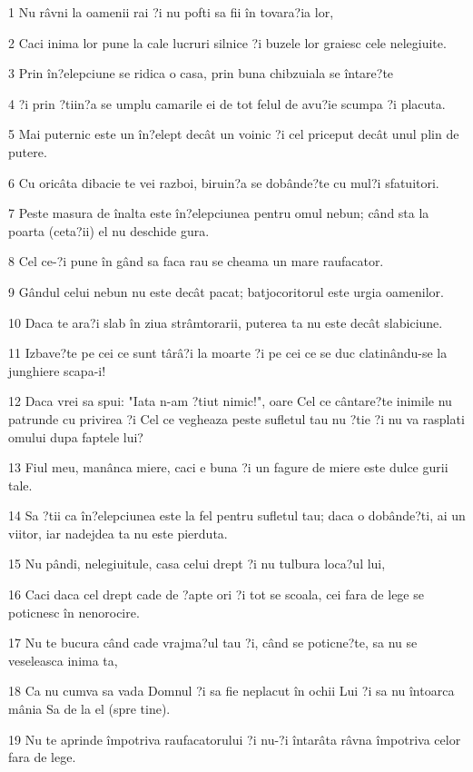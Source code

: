 \par 1 Nu râvni la oamenii rai ?i nu pofti sa fii în tovara?ia lor,
\par 2 Caci inima lor pune la cale lucruri silnice ?i buzele lor graiesc cele nelegiuite.
\par 3 Prin în?elepciune se ridica o casa, prin buna chibzuiala se întare?te
\par 4 ?i prin ?tiin?a se umplu camarile ei de tot felul de avu?ie scumpa ?i placuta.
\par 5 Mai puternic este un în?elept decât un voinic ?i cel priceput decât unul plin de putere.
\par 6 Cu oricâta dibacie te vei razboi, biruin?a se dobânde?te cu mul?i sfatuitori.
\par 7 Peste masura de înalta este în?elepciunea pentru omul nebun; când sta la poarta (ceta?ii) el nu deschide gura.
\par 8 Cel ce-?i pune în gând sa faca rau se cheama un mare raufacator.
\par 9 Gândul celui nebun nu este decât pacat; batjocoritorul este urgia oamenilor.
\par 10 Daca te ara?i slab în ziua strâmtorarii, puterea ta nu este decât slabiciune.
\par 11 Izbave?te pe cei ce sunt târâ?i la moarte ?i pe cei ce se duc clatinându-se la junghiere scapa-i!
\par 12 Daca vrei sa spui: "Iata n-am ?tiut nimic!", oare Cel ce cântare?te inimile nu patrunde cu privirea ?i Cel ce vegheaza peste sufletul tau nu ?tie ?i nu va rasplati omului dupa faptele lui?
\par 13 Fiul meu, manânca miere, caci e buna ?i un fagure de miere este dulce gurii tale.
\par 14 Sa ?tii ca în?elepciunea este la fel pentru sufletul tau; daca o dobânde?ti, ai un viitor, iar nadejdea ta nu este pierduta.
\par 15 Nu pândi, nelegiuitule, casa celui drept ?i nu tulbura loca?ul lui,
\par 16 Caci daca cel drept cade de ?apte ori ?i tot se scoala, cei fara de lege se poticnesc în nenorocire.
\par 17 Nu te bucura când cade vrajma?ul tau ?i, când se poticne?te, sa nu se veseleasca inima ta,
\par 18 Ca nu cumva sa vada Domnul ?i sa fie neplacut în ochii Lui ?i sa nu întoarca mânia Sa de la el (spre tine).
\par 19 Nu te aprinde împotriva raufacatorului ?i nu-?i întarâta râvna împotriva celor fara de lege.
